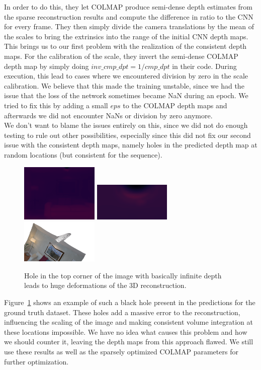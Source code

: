         In order to do this, they let COLMAP produce semi-dense depth estimates from the sparse reconstruction results and compute the difference in ratio to the CNN for every frame.
        They then simply divide the camera translations by the mean of the scales to bring the extrinsics into the range of the initial CNN depth maps.\\
        This brings us to our first problem with the realization of the consistent depth maps.
        For the calibration of the scale, they invert the semi-dense COLMAP depth map by simply doing $inv\_cmp\_dpt = 1 / cmp\_dpt$ in their code.
        During execution, this lead to cases where we encountered division by zero in the scale calibration.
        We believe that this made the training unstable, since we had the issue that the loss of the network sometimes became NaN during an epoch.
        We tried to fix this by adding a small $eps$ to the COLMAP depth maps and afterwards we did not encounter NaNs or division by zero anymore.\\
        We don't want to blame the issues entirely on this, since we did not do enough testing to rule out other possibilities, especially since this did not fix our second issue with the consistent depth maps, namely holes in the predicted depth map at random locations (but consistent for the sequence).
        \begin{figure}
            \centering
            \includegraphics[width=0.33\textwidth]{images/hole.png}
            \includegraphics[width=0.33\textwidth]{images/hole_zoom.png}
            \includegraphics[width=0.33\textwidth]{images/hole_recon.png}
            \caption{Hole in the top corner of the image with basically infinite depth leads to huge deformations of the 3D reconstruction.}
            \label{holes}
        \end{figure}
        Figure~\ref{holes} shows an example of such a black hole present in the predictions for the ground truth dataset.
        These holes add a massive error to the reconstruction, influencing the scaling of the image and making consistent volume integration at these locations impossible.
        We have no idea what causes this problem and how we should counter it, leaving the depth maps from this approach flawed.
        We still use these results as well as the sparsely optimized COLMAP parameters for further optimization.
    
